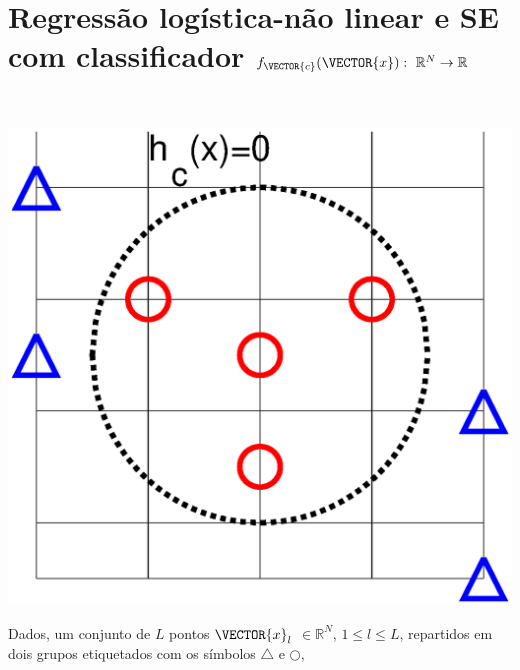 \newpage

\section{Regressão logística-não linear e SE com classificador $f_{\VECTOR{c}}(\VECTOR{x}):~\mathbb{R}^{N} \rightarrow \mathbb{R}$}


\begin{theorem}\label{theo:reglogrnr1nolinear:1}
~\\
\noindent
\begin{minipage}{0.45\textwidth}
\centering
\includegraphics[width=0.95\linewidth]{chapters/classificacao/mfiles/reglogrnr1nolinear/reglogrnr1nolinear.eps} 
\end{minipage}
\begin{minipage}{0.55\textwidth}
Dados, um conjunto de $L$ pontos
$\VECTOR{x}_l$ $\in \mathbb{R}^{N}$, $1\leq l \leq L$,
repartidos em dois grupos etiquetados com os símbolos $\bigtriangleup$ e $\bigcirc$,

\end{minipage}
\end{theorem}
